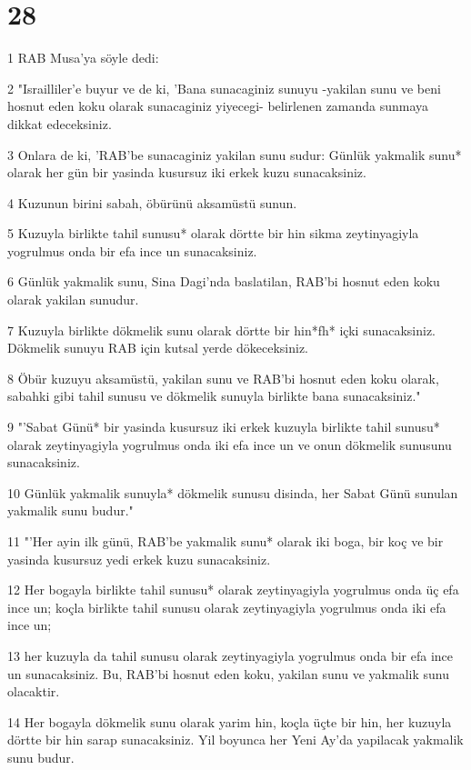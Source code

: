 \chapter{28}

\par 1 RAB Musa'ya söyle dedi:
\par 2 "Israilliler'e buyur ve de ki, 'Bana sunacaginiz sunuyu -yakilan sunu ve beni hosnut eden koku olarak sunacaginiz yiyecegi- belirlenen zamanda sunmaya dikkat edeceksiniz.
\par 3 Onlara de ki, 'RAB'be sunacaginiz yakilan sunu sudur: Günlük yakmalik sunu* olarak her gün bir yasinda kusursuz iki erkek kuzu sunacaksiniz.
\par 4 Kuzunun birini sabah, öbürünü aksamüstü sunun.
\par 5 Kuzuyla birlikte tahil sunusu* olarak dörtte bir hin sikma zeytinyagiyla yogrulmus onda bir efa ince un sunacaksiniz.
\par 6 Günlük yakmalik sunu, Sina Dagi'nda baslatilan, RAB'bi hosnut eden koku olarak yakilan sunudur.
\par 7 Kuzuyla birlikte dökmelik sunu olarak dörtte bir hin*fh* içki sunacaksiniz. Dökmelik sunuyu RAB için kutsal yerde dökeceksiniz.
\par 8 Öbür kuzuyu aksamüstü, yakilan sunu ve RAB'bi hosnut eden koku olarak, sabahki gibi tahil sunusu ve dökmelik sunuyla birlikte bana sunacaksiniz."
\par 9 "'Sabat Günü* bir yasinda kusursuz iki erkek kuzuyla birlikte tahil sunusu* olarak zeytinyagiyla yogrulmus onda iki efa ince un ve onun dökmelik sunusunu sunacaksiniz.
\par 10 Günlük yakmalik sunuyla* dökmelik sunusu disinda, her Sabat Günü sunulan yakmalik sunu budur."
\par 11 "'Her ayin ilk günü, RAB'be yakmalik sunu* olarak iki boga, bir koç ve bir yasinda kusursuz yedi erkek kuzu sunacaksiniz.
\par 12 Her bogayla birlikte tahil sunusu* olarak zeytinyagiyla yogrulmus onda üç efa ince un; koçla birlikte tahil sunusu olarak zeytinyagiyla yogrulmus onda iki efa ince un;
\par 13 her kuzuyla da tahil sunusu olarak zeytinyagiyla yogrulmus onda bir efa ince un sunacaksiniz. Bu, RAB'bi hosnut eden koku, yakilan sunu ve yakmalik sunu olacaktir.
\par 14 Her bogayla dökmelik sunu olarak yarim hin, koçla üçte bir hin, her kuzuyla dörtte bir hin sarap sunacaksiniz. Yil boyunca her Yeni Ay'da yapilacak yakmalik sunu budur.
